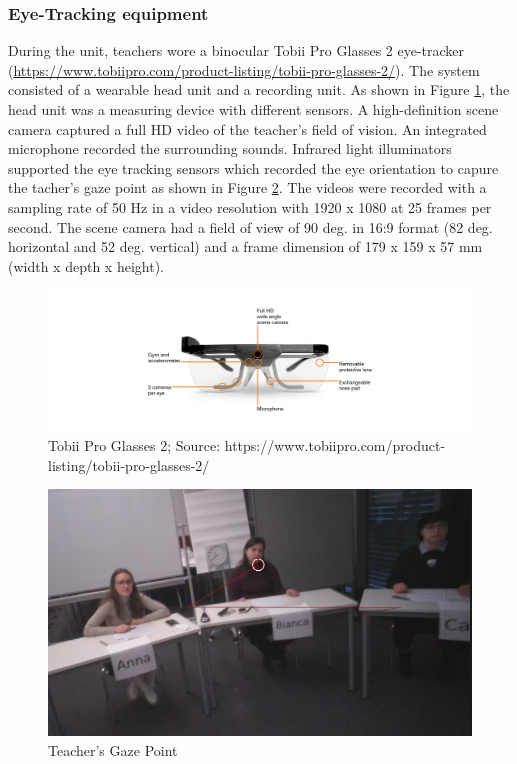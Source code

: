 \documentclass[
  man,floatsintext]{apa6}
\begin{document}
\hypertarget{eye-tracking-equipment}{%
\subsubsection{Eye-Tracking equipment}\label{eye-tracking-equipment}}

During the unit, teachers wore a binocular Tobii Pro Glasses 2 eye-tracker (\url{https://www.tobiipro.com/product-listing/tobii-pro-glasses-2/}). The system consisted of a wearable head unit and a recording unit. As shown in Figure \ref{fig:tobiiglasses2}, the head unit was a measuring device with different sensors. A high-definition scene camera captured a full HD video of the teacher's field of vision. An integrated microphone recorded the surrounding sounds. Infrared light illuminators supported the eye tracking sensors which recorded the eye orientation to capure the tacher's gaze point as shown in Figure \ref{fig:teachergazepoint}. The videos were recorded with a sampling rate of 50 Hz in a video resolution with 1920 x 1080 at 25 frames per second. The scene camera had a field of view of 90 deg. in 16:9 format (82 deg. horizontal and 52 deg. vertical) and a frame dimension of 179 x 159 x 57 mm (width x depth x height).

\begin{figure}

{\centering \includegraphics[width=14.07in]{./pictures/tobiiglasses2} 

}

\caption{Tobii Pro Glasses 2; Source: https://www.tobiipro.com/product-listing/tobii-pro-glasses-2/}\label{fig:tobiiglasses2}
\end{figure}

\begin{figure}

{\centering \includegraphics[width=7.16in]{./pictures/teachergazepoint} 

}

\caption{Teacher's Gaze Point}\label{fig:teachergazepoint}
\end{figure}
\end{document}
